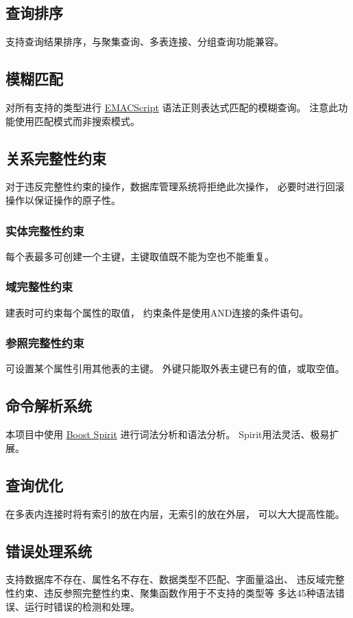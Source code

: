     \subsection{查询排序}
        支持查询结果排序，与聚集查询、多表连接、分组查询功能兼容。
    \subsection{模糊匹配}
        对所有支持的类型进行%
        \href{http://ecma-international.org/ecma-262/5.1/#sec-15.10}{EMACScript}%
        语法正则表达式匹配的模糊查询。%
        注意此功能使用匹配模式而非搜索模式。
    \subsection{关系完整性约束}
        对于违反完整性约束的操作，数据库管理系统将拒绝此次操作，%
        必要时进行回滚操作以保证操作的原子性。
        \subsubsection{实体完整性约束}
            每个表最多可创建一个主键，主键取值既不能为空也不能重复。
        \subsubsection{域完整性约束}
            建表时可约束每个属性的取值，%
            约束条件是使用AND连接的条件语句。%
        \subsubsection{参照完整性约束}
            可设置某个属性引用其他表的主键。%
            外键只能取外表主键已有的值，或取空值。
    \subsection{命令解析系统}
        本项目中使用%
        \href{http://www.boost.org/doc/libs/1_57_0/libs/spirit/doc/html/index.html}{Boost Spirit}%
        进行词法分析和语法分析。%
        Spirit用法灵活、极易扩展。
    \subsection{查询优化}
        在多表内连接时将有索引的放在内层，无索引的放在外层，%
        可以大大提高性能。
    \subsection{错误处理系统}
        支持数据库不存在、属性名不存在、数据类型不匹配、字面量溢出、%
        违反域完整性约束、违反参照完整性约束、聚集函数作用于不支持的类型等%
        多达45种语法错误、运行时错误的检测和处理。
